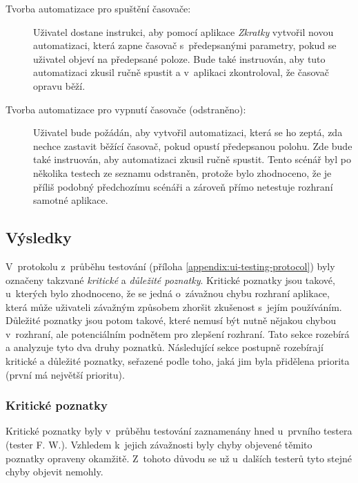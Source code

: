 \begin{description}
\item[Tvorba automatizace pro spuštění časovače:] Uživatel dostane instrukci, aby pomocí aplikace \emph{Zkratky} vytvořil novou automatizaci, která zapne časovač s~předepsanými parametry, pokud se uživatel objeví na předepsané poloze. Bude také instruován, aby tuto automatizaci zkusil ručně spustit a v~aplikaci zkontroloval, že časovač opravu běží.
\item[Tvorba automatizace pro vypnutí časovače (odstraněno):] Uživatel bude požádán, aby vytvořil automatizaci, která se ho zeptá, zda nechce zastavit běžící časovač, pokud opustí předepsanou polohu. Zde bude také instruován, aby automatizaci zkusil ručně spustit. Tento scénář byl po několika testech ze seznamu odstraněn, protože bylo zhodnoceno, že je příliš podobný předchozímu scénáři a zároveň přímo netestuje rozhraní samotné aplikace.
\end{description}

\subsection{Výsledky}\label{ui-testing-results}

V~protokolu z~průběhu testování (příloha \ref{appendix:ui-testing-protocol}) byly označeny takzvané \emph{kritické} a \emph{důležité poznatky}. Kritické poznatky jsou takové, u~kterých bylo zhodnoceno, že se jedná o~závažnou chybu rozhraní aplikace, která může uživateli závažným způsobem zhoršit zkušenost s~jejím používáním. Důležité poznatky jsou potom takové, které nemusí být nutně nějakou chybou v~rozhraní, ale potenciálním podnětem pro zlepšení rozhraní. Tato sekce rozebírá a analyzuje tyto dva druhy poznatků. Následující sekce postupně rozebírají kritické a důležité poznatky, seřazené podle toho, jaká jim byla přidělena priorita (první má největší prioritu).

\subsubsection{Kritické poznatky}

Kritické poznatky byly v~průběhu testování zaznamenány hned u~prvního testera (tester F. W.). Vzhledem k~jejich závažnosti byly chyby objevené těmito poznatky opraveny okamžitě. Z~tohoto důvodu se už u~dalších testerů tyto stejné chyby objevit nemohly.

